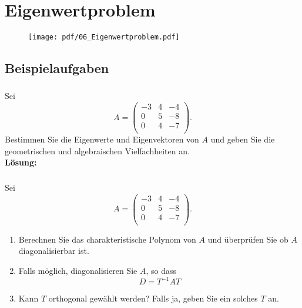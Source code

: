 \section{Eigenwertproblem}
\begin{figure}[h!]
    \texttt{[image: pdf/06\_Eigenwertproblem.pdf]}
\end{figure}
\newpage


\subsection{Beispielaufgaben} 
\vspace{1cm}
\subsubsection{} %
Sei \[
A = \begin{pmatrix}
-3 & 4 & -4 \\
0 & 5 & -8 \\
0 & 4 & -7 \\
\end{pmatrix}.
\]
Bestimmen Sie die Eigenwerte und Eigenvektoren von $A$ und geben Sie die geometrischen und algebraischen Vielfachheiten an. \\

\noindent \textbf{Lösung:}

\newpage
\subsubsection{} %
Sei \[
A = \begin{pmatrix}
-3 & 4 & -4 \\
0 & 5 & -8 \\
0 & 4 & -7 \\
\end{pmatrix}.
\]
\begin{enumerate}[label=\alph*)]
    \item Berechnen Sie das charakteristische Polynom von $A$ und überprüfen Sie ob $A$ diagonalisierbar ist.
    \item Falls möglich, diagonalisieren Sie $A$, so dass \[ D = T^{-1}AT\]
    \item Kann $T$ orthogonal gewählt werden? Falls ja, geben Sie ein solches $T$ an.
\end{enumerate}

